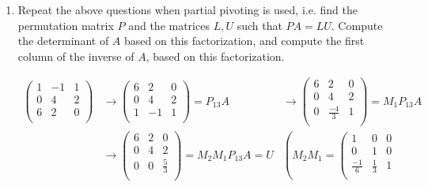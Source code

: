 \documentclass[11pt]{article}
\begin{document}
\begin{enumerate}
\begin{enumerate}
		      \item Repeat the above questions when partial pivoting is used, i.e. find the permutation matrix \(P\) and the matrices \(L,U\) such that \(PA = LU\).  Compute the determinant of \(A\) based on this factorization, and compute the first column of the inverse of \(A\), based on this factorization.

		            \begin{align*}
			            \left(\begin{array}{rrr}
					                  1 & -1 & 1 \\
					                  0 & 4  & 2 \\
					                  6 & 2  & 0 \\
				                  \end{array}\right)
			              & \to
			            \left(\begin{array}{rrr}
					                  6 & 2  & 0 \\
					                  0 & 4  & 2 \\
					                  1 & -1 & 1 \\
				                  \end{array}\right)
			            = P_{13}A
			              & \to
			            \left(\begin{array}{rrr}
					                  6 & 2          & 0 \\
					                  0 & 4          & 2 \\
					                  0 & \frac{-4}3 & 1 \\
				                  \end{array}\right)
			            = M_1 P_{13} A
			            \\
			              & \to
			            \left(\begin{array}{rrr}
					                  6 & 2 & 0       \\
					                  0 & 4 & 2       \\
					                  0 & 0 & \frac53 \\
				                  \end{array}\right)
			            = M_2 M_1 P_{13} A = U
			              & \left(
			            M_2 M_1 =
			            \left(\begin{array}{rrr}
						                  1          & 0       & 0 \\
						                  0          & 1       & 0 \\
						                  \frac{-1}6 & \frac13 & 1 \\

\end{array}
\end{align*}
\end{enumerate}
\end{enumerate}
\end{document}

